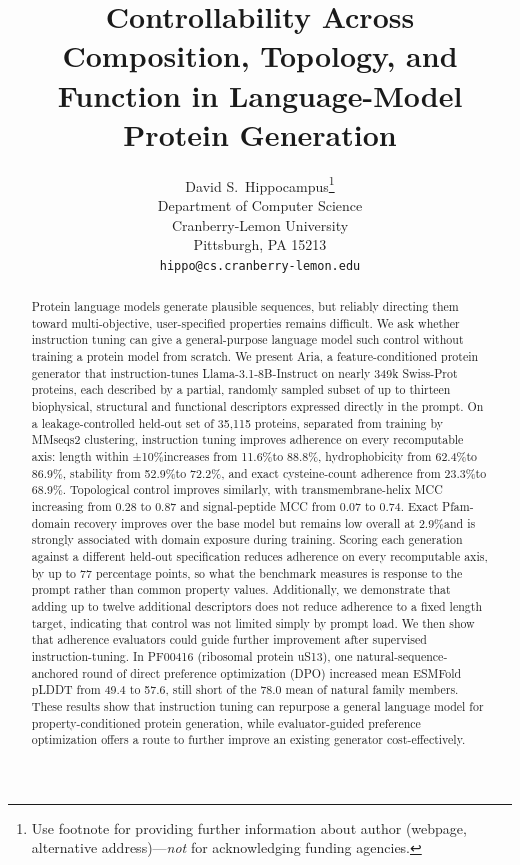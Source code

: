 \documentclass{article}
\title{Controllability Across Composition, Topology, and Function in Language-Model Protein Generation}
\author{%
  David S.~Hippocampus\thanks{Use footnote for providing further information
    about author (webpage, alternative address)---\emph{not} for acknowledging
    funding agencies.} \\
  Department of Computer Science\\
  Cranberry-Lemon University\\
  Pittsburgh, PA 15213 \\
  \texttt{hippo@cs.cranberry-lemon.edu} \\
}
\newcommand{\pct}{\%}
\begin{document}
\maketitle


\begin{abstract}
Protein language models generate plausible sequences, but reliably directing them toward multi-objective, user-specified properties remains difficult. We ask whether instruction tuning can give a general-purpose language model such control without training a protein model from scratch. We present Aria, a feature-conditioned protein generator that instruction-tunes
Llama-3.1-8B-Instruct on nearly 349k Swiss-Prot proteins, each described by a
partial, randomly sampled subset of up to thirteen biophysical, structural and functional descriptors expressed directly in the prompt. On a leakage-controlled held-out set of 35,115 proteins, separated from training by MMseqs2 clustering, instruction tuning improves adherence on every recomputable axis: length within ±10\pct increases from 11.6\pct to 88.8\pct, hydrophobicity from 62.4\pct to 86.9\pct, stability from 52.9\pct to 72.2\pct, and exact cysteine-count adherence from 23.3\pct to 68.9\pct. Topological control improves similarly, with transmembrane-helix MCC increasing from 0.28 to 0.87 and signal-peptide MCC from 0.07 to 0.74. Exact Pfam-domain recovery improves over the base model but remains low overall at 2.9\pct and is strongly associated with domain exposure during training. Scoring each generation against a different held-out specification reduces adherence on every recomputable axis, by up to 77 percentage points, so what the benchmark measures is response to the prompt rather than common property values. Additionally, we demonstrate that adding up to twelve additional descriptors does not reduce adherence to a fixed length target, indicating that control was not limited simply by prompt load. We then show that adherence evaluators could guide further improvement after supervised instruction-tuning. In PF00416 (ribosomal protein uS13), one natural-sequence-anchored round of direct preference optimization (DPO)  \citep{rafailov2023dpo} increased mean ESMFold pLDDT from 49.4 to 57.6, still short of the 78.0 mean of natural family members. These results show that instruction tuning can repurpose a general language model for property-conditioned protein generation, while evaluator-guided preference optimization offers a route to further improve an existing generator cost-effectively.
\end{abstract}
\end{document}

